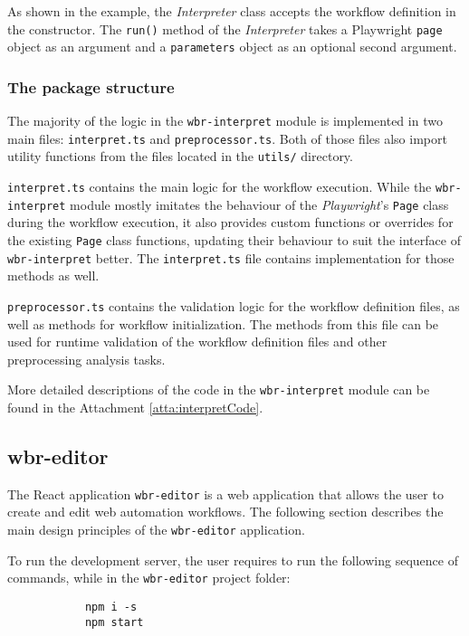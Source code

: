 As shown in the example, the \textit{Interpreter} class accepts the workflow definition in the constructor. The \texttt{run()} method of the \textit{Interpreter} takes a Playwright \texttt{page} object as an argument and a \texttt{parameters} object as an optional second argument.

\subsubsection{The package structure}

The majority of the logic in the \texttt{wbr-interpret} module is implemented in two main files: \texttt{interpret.ts} and \texttt{preprocessor.ts}.
Both of those files also import utility functions from the files located in the \texttt{utils/} directory.

\texttt{interpret.ts} contains the main logic for the workflow execution. 
While the \texttt{wbr-interpret} module mostly imitates the behaviour of the \textit{Playwright}'s \texttt{Page} class during the workflow execution,
it also provides custom functions or overrides for the existing \texttt{Page} class functions, updating their behaviour to suit the interface of \texttt{wbr-interpret} better.
The \texttt{interpret.ts} file contains implementation for those methods as well. 

\texttt{preprocessor.ts} contains the validation logic for the workflow definition files, as well as methods for workflow initialization.
The methods from this file can be used for runtime validation of the workflow definition files
and other preprocessing analysis tasks.

More detailed descriptions of the code in the \texttt{wbr-interpret} module can be found in the Attachment \ref{atta:interpretCode}.

\subsection{wbr-editor}

The React application \texttt{wbr-editor} is a web application that allows the user to create and edit web automation workflows.
The following section describes the main design principles of the \texttt{wbr-editor} application.

To run the development server, the user requires to run the following sequence of commands, while in the \texttt{wbr-editor} project folder:
\begin{center}
    \begin{minipage}[h!]{0.5\textwidth}
        \begin{verbatim}
            npm i -s
            npm start
        \end{verbatim}        
    \end{minipage}
\end{center}

